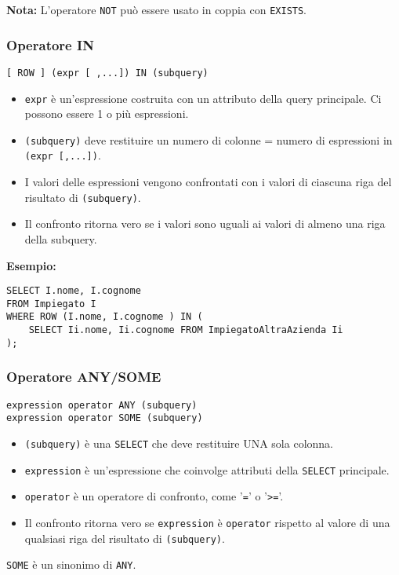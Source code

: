 \documentclass[a4paper, 10pt, titlepage]{article}
\begin{document}
			\noindent
			\textbf{Nota: } L’operatore \lstinline|NOT| può essere usato in coppia con \lstinline|EXISTS|.
			\bigskip
			
	\subsubsection*{Operatore IN}
		\begin{lstlisting}
[ ROW ] (expr [ ,...]) IN (subquery)
		\end{lstlisting}
		
		\begin{itemize}
				\item \lstinline|expr| è un’espressione costruita con un attributo della query principale.
			Ci possono essere 1 o più espressioni.
			
				\item \lstinline|(subquery)| deve restituire un numero di colonne = numero di
			espressioni in \lstinline|(expr [,...])|.
			
				\item I valori delle espressioni vengono confrontati con i valori di ciascuna riga
			del risultato di \lstinline|(subquery)|.
			
				\item Il confronto ritorna vero se i valori sono uguali ai valori di almeno una
			riga della subquery.
			\end{itemize}
		\textbf{Esempio:} 
		\begin{lstlisting}
SELECT I.nome, I.cognome
FROM Impiegato I
WHERE ROW (I.nome, I.cognome ) IN (
    SELECT Ii.nome, Ii.cognome FROM ImpiegatoAltraAzienda Ii
);
		\end{lstlisting}
		
	\subsubsection*{Operatore ANY/SOME}
		\begin{lstlisting}
expression operator ANY (subquery)
expression operator SOME (subquery)
		\end{lstlisting}
		\begin{itemize}
		\item \lstinline|(subquery)| è una \lstinline|SELECT| che deve restituire UNA sola colonna.
		\item \lstinline|expression| è un’espressione che coinvolge attributi della \lstinline|SELECT|
		principale.
		\item \lstinline|operator| è un operatore di confronto, come '\lstinline|=|' o '\lstinline|>=|'.
		\item Il confronto ritorna vero se \lstinline|expression| è \lstinline|operator| rispetto al valore di una qualsiasi riga del risultato di \lstinline|(subquery)|.
		\end{itemize}
		\lstinline|SOME| è un sinonimo di \lstinline|ANY|. \medskip
		
\end{document}
